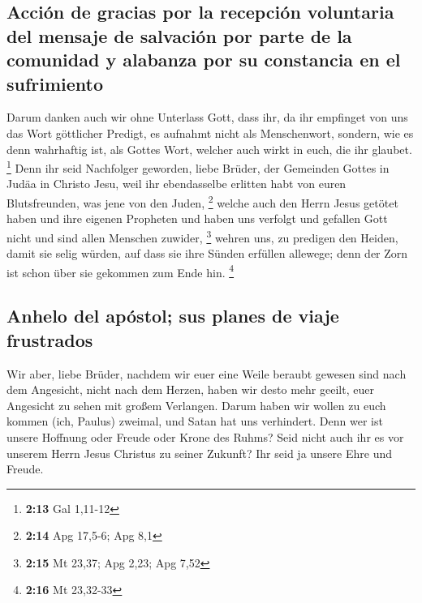 \hypertarget{acciuxf3n-de-gracias-por-la-recepciuxf3n-voluntaria-del-mensaje-de-salvaciuxf3n-por-parte-de-la-comunidad-y-alabanza-por-su-constancia-en-el-sufrimiento}{%
\subsection{Acción de gracias por la recepción voluntaria del mensaje de
salvación por parte de la comunidad y alabanza por su constancia en el
sufrimiento}\label{acciuxf3n-de-gracias-por-la-recepciuxf3n-voluntaria-del-mensaje-de-salvaciuxf3n-por-parte-de-la-comunidad-y-alabanza-por-su-constancia-en-el-sufrimiento}}

 Darum danken auch wir ohne Unterlass Gott, dass ihr, da
ihr empfinget von uns das Wort göttlicher Predigt, es aufnahmt nicht als
Menschenwort, sondern, wie es denn wahrhaftig ist, als Gottes Wort,
welcher auch wirkt in euch, die ihr glaubet. \footnote{\textbf{2:13} Gal
  1,11-12}  Denn ihr seid Nachfolger geworden, liebe
Brüder, der Gemeinden Gottes in Judäa in Christo Jesu, weil ihr
ebendasselbe erlitten habt von euren Blutsfreunden, was jene von den
Juden, \footnote{\textbf{2:14} Apg 17,5-6; Apg 8,1} 
welche auch den Herrn Jesus getötet haben und ihre eigenen Propheten und
haben uns verfolgt und gefallen Gott nicht und sind allen Menschen
zuwider, \footnote{\textbf{2:15} Mt 23,37; Apg 2,23; Apg 7,52}
 wehren uns, zu predigen den Heiden, damit sie selig
würden, auf dass sie ihre Sünden erfüllen allewege; denn der Zorn ist
schon über sie gekommen zum Ende hin. \footnote{\textbf{2:16} Mt
  23,32-33}

\hypertarget{anhelo-del-apuxf3stol-sus-planes-de-viaje-frustrados}{%
\subsection{Anhelo del apóstol; sus planes de viaje
frustrados}\label{anhelo-del-apuxf3stol-sus-planes-de-viaje-frustrados}}

 Wir aber, liebe Brüder, nachdem wir euer eine Weile
beraubt gewesen sind nach dem Angesicht, nicht nach dem Herzen, haben
wir desto mehr geeilt, euer Angesicht zu sehen mit großem Verlangen.
 Darum haben wir wollen zu euch kommen (ich, Paulus)
zweimal, und Satan hat uns verhindert.  Denn wer ist
unsere Hoffnung oder Freude oder Krone des Ruhms? Seid nicht auch ihr es
vor unserem Herrn Jesus Christus zu seiner Zukunft?  Ihr
seid ja unsere Ehre und Freude.

